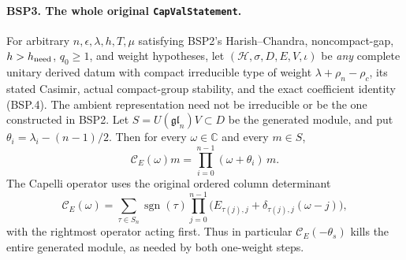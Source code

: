 \documentclass[11pt,a4paper]{article}
\numberwithin{equation}{section}
\theoremstyle{remark}\newtheorem{remark}[theorem]{Remark}
\begin{document}
\paragraph{BSP3. The whole original \texttt{Cap\allowbreak Val\allowbreak Statement}.}
\label{claim:BSP3}
For arbitrary $n,\epsilon,\lambda,h,T,\mu$ satisfying BSP2's
Harish--Chandra, noncompact-gap, $h>h_{\rm need}$, $q_0\ge1$,
and weight hypotheses, let $(\mathcal H,\sigma,D,E,V,\iota)$ be
\emph{any} complete unitary derived datum with compact irreducible
type of weight $\lambda+\rho_n-\rho_c$, its stated Casimir,
actual compact-group stability, and the exact coefficient identity
(BSP.4).  The ambient representation need not be irreducible or be
the one constructed in BSP2.
Let $S=U(\mathfrak{gl}_n)V\subset D$ be the generated module, and put
$\theta_i=\lambda_i-(n-1)/2$.  Then for every $\omega\in\mathbb C$
and every $m\in S$,
\[
 \mathcal C_E(\omega)m
       =\prod_{i=0}^{n-1}(\omega+\theta_i)\,m.
 \tag{BSP.5}
\]
The Capelli operator uses the original ordered column determinant
\[
 \mathcal C_E(\omega)
 =\sum_{\tau\in S_n}\operatorname{sgn}(\tau)
   \prod_{j=0}^{n-1}
       \bigl(E_{\tau(j),j}+\delta_{\tau(j),j}(\omega-j)\bigr),
 \tag{BSP.6}
\]
with the rightmost operator acting first.  Thus in particular
$\mathcal C_E(-\theta_s)$ kills the entire generated module, as needed
by both one-weight steps.
\end{document}
